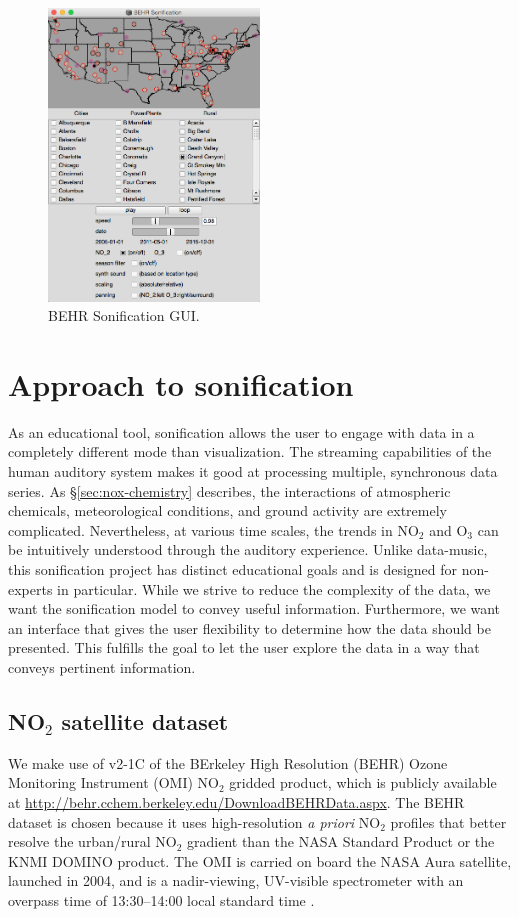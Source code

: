 \documentclass[a4paper,10pt,oneside]{article}
\newcommand{\ce}[1]{$\mathrm{#1}$}
\begin{document}
\begin{sloppy}
\begin{figure}[t]
\centering
\includegraphics[width=0.5\textwidth]{figs/gui.png}
\caption{BEHR Sonification GUI.}
\label{fig:gui}
\end{figure}

\section{Approach to sonification}
As an educational tool, sonification allows the user to engage with data in a completely different mode than visualization. The streaming capabilities of the human auditory system makes it good at processing multiple, synchronous data series. As \S \ref{sec:nox-chemistry} describes, the interactions of atmospheric chemicals, meteorological conditions, and ground activity are extremely complicated. Nevertheless, at various time scales, the trends in \ce{NO_2} and \ce{O_3} can be intuitively understood through the auditory experience. Unlike data-music, this sonification project has distinct educational goals and is designed for non-experts in particular. While we strive to reduce the complexity of the data, we want the sonification model to convey useful information.  Furthermore, we want an interface that gives the user flexibility to determine how the data should be presented.  This fulfills the goal to let the user explore the data in a way that conveys pertinent information.  

\subsection{NO$_2$ satellite dataset}
	We make use of v2-1C of the BErkeley High Resolution (BEHR) Ozone Monitoring Instrument (OMI) \ce{NO_2} gridded product, which is publicly available at \url{http://behr.cchem.berkeley.edu/DownloadBEHRData.aspx}. The BEHR dataset is chosen because it uses high-resolution \emph{a priori} \ce{NO_2} profiles that better resolve the urban/rural \ce{NO_2} gradient than the NASA Standard Product or the KNMI DOMINO product. The OMI is carried on board the NASA Aura satellite, launched in 2004, and is a nadir-viewing, UV-visible spectrometer with an overpass time of 13:30--14:00 local standard time \cite{levelt06}.
	

\end{sloppy}
\end{document}
